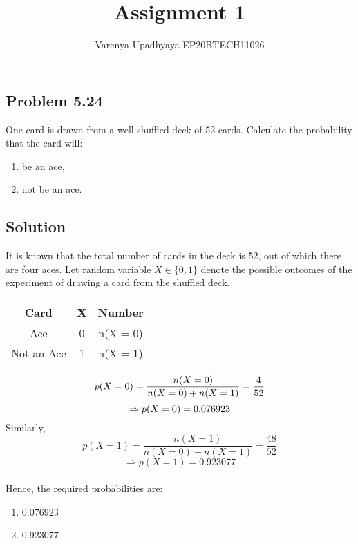 \documentclass[a4paper, twocolumn]{article}
\title{Assignment 1}
\author{Varenya Upadhyaya EP20BTECH11026}
\date{}
\begin{document}
    \maketitle   
    \begin{center}
    \section*{Problem 5.24}
    \end{center}
    One card is drawn from a well-shuffled deck of 52 cards. Calculate the probability that the card will:
    \begin{enumerate}[label=(\roman*)]
        \item be an ace,
        \item not be an ace.
    \end{enumerate}
    \begin{center}
    \maketitle
        \section*{Solution}
    \end{center}
    It is known that the total number of cards in the deck is 52, out of which there are four aces. Let random variable $X \in \{0,1\}$ denote the possible outcomes of the experiment of drawing a card from the shuffled deck.\\
    \begin{center}
        \begin{tabular}{|c|c|c|}
        \hline
        \textbf{Card} & \textbf{X} & \textbf{Number}\\
        \hline
        Ace & 0 & n(X = 0)\\
        \hline
        Not an Ace & 1 & n(X = 1)\\
        \hline
        \end{tabular}
    \end{center}
    
    
    \begin{equation}
        p(X=0) = \frac{n(X = 0)}{n(X = 0) + n(X = 1)} = \frac{4}{52}\\
    \end{equation}
    \begin{equation}
        \Rightarrow p(X=0) = 0.076923\\
    \end{equation}
    Similarly,\\
    \begin{equation}
        p(X = 1) = \frac{n(X=1)}{n(X=0)+n(X=1)} = \frac{48}{52}
    \end{equation}
    \begin{equation}
        \Rightarrow p(X=1) = 0.923077
    \end{equation}
    \\Hence, the required probabilities are:
    \begin{enumerate}[label=(\roman*)]
        \item 0.076923
        \item 0.923077
    \end{enumerate}
\end{document}
